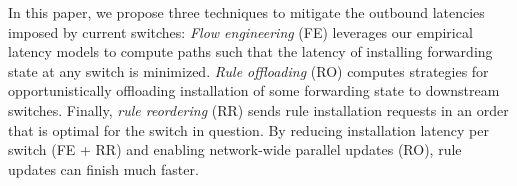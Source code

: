 


\iffalse
Since hardware upgrade cycles are 5+ years long (according to anecdotal
evidence), operators need immediately deployable solutions to 
mitigate these latencies while they wait for switch software and hardware to
appropriately evolve. 
\fi

\iffalse
Many SDN applications already avoid (or minimize their dependence on) packet-in 
messages, thereby mitigating the impact of inbound latency. In contrast, rule
installations/updates are an intrinsic part of SDN applications, which makes
outbound latency more challenging, and important, to address.
\fi
\iffalse
In this paper, we propose three techniques to mitigate the outbound latencies
imposed by current switches:
{\em Flow engineering} (FE) leverages our empirical latency models to compute
paths such that the latency of installing forwarding state at any
switch is minimized. 
{\em Rule
  offloading} (RO) computes strategies for opportunistically
offloading installation of some forwarding state to downstream switches.
Finally, {\em rule reordering} (RR) sends rule installation
requests in an order that is optimal for the switch in question. By reducing
installation latency per switch (FE + RR) and enabling network-wide parallel
updates (RO), 
rule updates can finish much faster.

